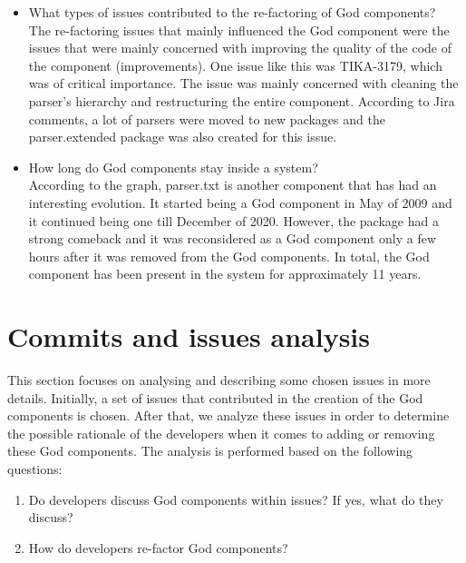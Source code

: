 \documentclass{article}
\begin{document}
\begin{itemize}
    \item	What types of issues contributed to the re-factoring of God components?\\
    The re-factoring issues that mainly influenced the God component were  the issues that were mainly concerned with improving the quality of the code of the component (improvements). One issue like this was TIKA-3179, which was of critical importance. The issue was mainly concerned with cleaning the parser’s hierarchy and restructuring the entire component. According to Jira comments, a lot of parsers were moved to new packages and the parser.extended package was also created for this issue.\\
    \item How long do God components stay inside a system?\\
    According to the graph, parser.txt is another component that has had an interesting evolution. It started being a God component in May of 2009 and it continued being one till December of 2020. However, the package had a strong comeback and it was reconsidered as a God component only a few hours after it was removed from the God components. In total, the God component has been present in the system for approximately 11 years.
    
\end{itemize}

\section{Commits and issues analysis}
This section focuses on analysing and describing some chosen issues in more details. Initially, a set of issues that contributed in the creation of the God components is chosen. After that, we analyze these issues in order to determine the possible rationale of the developers when it comes to adding or removing these God components. The analysis is performed based on the following questions:
\begin{enumerate}
\item Do developers discuss God components within issues? If yes, what do they discuss?
\item How do developers re-factor God components?
\end{enumerate}
\end{document}
